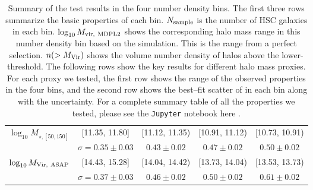 \begin{table*}
{\begin{tabular}{|c|cccc|}
\multirow{2}{*}{$\log_{10} M_{\star, [50, 150]}$} & [11.35, 11.80] & [11.12, 11.35) & [10.91, 11.12) & [10.73, 10.91)  \\ 
& $\sigma=0.35\pm0.03$ & $0.43\pm0.02$ & $0.47\pm0.02$ & $0.50\pm0.02$ \\ \hline

\multirow{2}{*}{$\log_{10} M_{\rm Vir,\ ASAP}$} & [14.43, 15.28] & [14.04, 14.42) & [13.73, 14.04) & [13.53, 13.73)  \\ 
& $\sigma=0.37\pm0.03$ & $0.46\pm0.02$ & $0.50\pm0.02$ & $0.61\pm0.02$ \\ \hline

\end{tabular}%
}
\caption{
	Summary of the \topn{} test results in the four number density bins. 
	The first three rows summarize the basic properties of each bin.
	$N_{\rm sample}$ is the number of HSC galaxies in each bin. 
	$\log_{10}M_{\rm vir,\ MDPL2}$ shows the corresponding halo mass range in this number density bin based 
	on the  simulation. This is the \mvir{} range from a perfect \topn{} selection.
	$n(>M_{\rm Vir})$ shows the volume number density of halos above the lower-\mvir{} threshold.
	The following rows show the key results for different halo mass proxies. 
	For each proxy we tested, the first row shows the range of the observed properties in the four 
	bins, and the second row shows the best--fit scatter of \mvir{} in each bin along with the 
	uncertainty.
	For a complete summary table of all the properties we tested, please see the \texttt{Jupyter} notebook
	here .
	}
\label{tab:summary}
\end{table*}